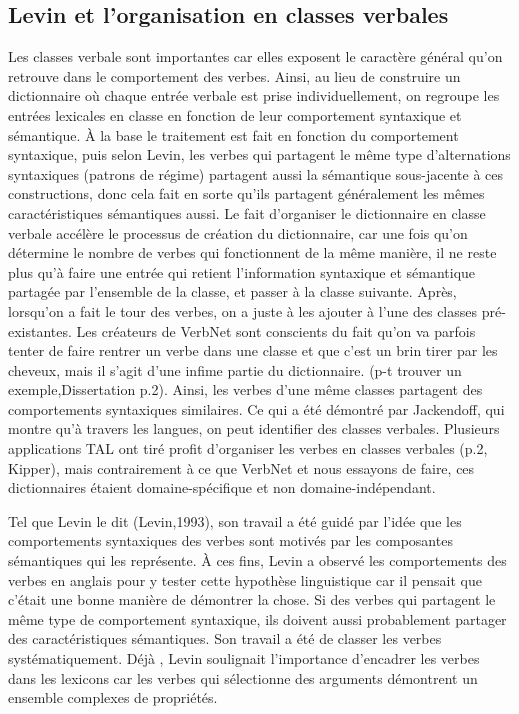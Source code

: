 \subsection{Levin et l'organisation en classes verbales}

Les classes verbale sont importantes car elles exposent le caractère général qu'on retrouve dans le comportement des verbes. Ainsi, au lieu de construire un dictionnaire où chaque entrée verbale est prise individuellement, on regroupe les entrées lexicales en classe en fonction de leur comportement syntaxique et sémantique. À la base le traitement est fait en fonction du comportement syntaxique, puis selon Levin, les verbes qui partagent le même type d'alternations syntaxiques (patrons de régime) partagent aussi la sémantique sous-jacente à ces constructions, donc cela fait en sorte qu'ils partagent généralement les mêmes caractéristiques sémantiques aussi. Le fait d'organiser le dictionnaire en classe verbale accélère le processus de création du dictionnaire, car une fois qu'on détermine le nombre de verbes qui fonctionnent de la même manière, il ne reste plus qu'à faire une entrée qui retient l'information syntaxique et sémantique partagée par l'ensemble de la classe, et passer à la classe suivante. Après, lorsqu'on a fait le tour des verbes, on a juste à les ajouter à l'une des classes pré-existantes. Les créateurs de VerbNet sont conscients du fait qu'on va parfois tenter de faire rentrer un verbe dans une classe et que c'est un brin tirer par les cheveux, mais il s'agit d'une infime partie du dictionnaire. (p-t trouver un exemple,Dissertation p.2). Ainsi, les verbes d'une même classes partagent des comportements syntaxiques similaires. Ce qui a été démontré par Jackendoff, qui montre qu'à travers les langues, on peut identifier des classes verbales. Plusieurs applications TAL ont tiré profit d'organiser les verbes en classes verbales (p.2, Kipper), mais contrairement à ce que VerbNet et nous essayons de faire, ces dictionnaires étaient domaine-spécifique et non domaine-indépendant.

Tel que Levin le dit (Levin,1993), son travail a été guidé par l'idée que les comportements syntaxiques des verbes sont motivés par les composantes sémantiques qui les représente. À ces fins, Levin a observé les comportements des verbes en anglais pour y tester cette hypothèse linguistique car il pensait que c'était une bonne manière de démontrer la chose. Si des verbes qui partagent le même type de comportement syntaxique, ils doivent aussi probablement partager des caractéristiques sémantiques. Son travail a été de classer les verbes systématiquement. Déjà , Levin soulignait l'importance d'encadrer les verbes dans les lexicons car les verbes qui sélectionne des arguments démontrent un ensemble complexes de propriétés.

